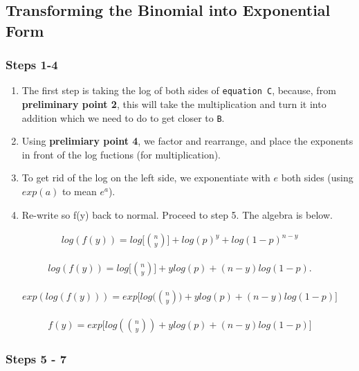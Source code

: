 \documentclass[
]{article}
\providecommand{\tightlist}{%
  \setlength{\itemsep}{0pt}\setlength{\parskip}{0pt}}
\begin{document}
\hypertarget{transforming-the-binomial-into-exponential-form}{%
\subsection{Transforming the Binomial into Exponential
Form}\label{transforming-the-binomial-into-exponential-form}}

\hypertarget{steps-1-4}{%
\subsubsection{Steps 1-4}\label{steps-1-4}}

\begin{enumerate}
\def\labelenumi{\arabic{enumi}.}
\tightlist
\item
  The first step is taking the log of both sides of
  \texttt{equation\ C}, because, from \textbf{preliminary point 2}, this
  will take the multiplication and turn it into addition which we need
  to do to get closer to \texttt{B}.
\item
  Using \textbf{prelimiary point 4}, we factor and rearrange, and place
  the exponents in front of the log fuctions (for multiplication).
\item
  To get rid of the log on the left side, we exponentiate with \(e\)
  both sides (using \(exp(a)\) to mean \(e^a\)).
\item
  Re-write so f(y) back to normal. Proceed to step 5. The algebra is
  below.
\end{enumerate}

\begin{align}
\tag{1}
log(f(y)) = log\biggl[{n\choose y}\biggr]+ log(p)^y + log(1-p)^{n-y}
\end{align}

\begin{align}
\tag{2}
log(f(y)) = log\biggl[{n\choose y}\biggr]+ ylog(p) + (n-y)log(1-p) .
\end{align}

\begin{align}
\tag{3}
exp(log(f(y))) = exp\biggl[log\biggl({n\choose y}\biggr)+ ylog(p) + (n-y)log(1-p)\biggr]
\end{align}

\begin{align}
\tag{4}
f(y) = exp\biggl[log({n\choose y})+ ylog(p) + (n-y)log(1-p)\biggr]
\end{align}

\hypertarget{steps-5---7}{%
\subsubsection{Steps 5 - 7}\label{steps-5---7}}
\end{document}
